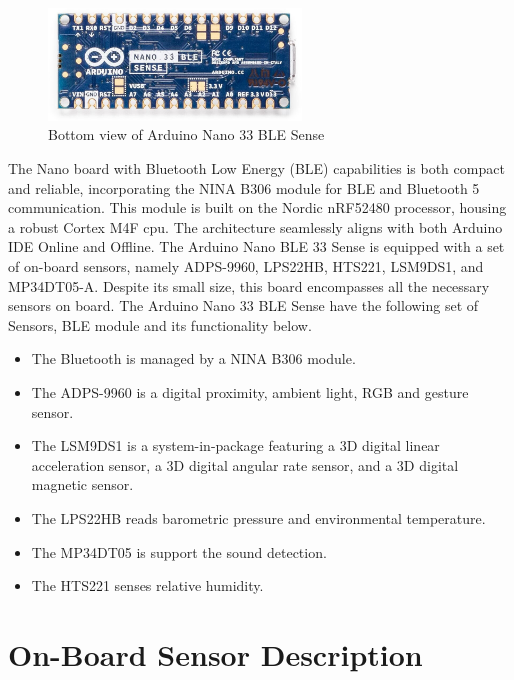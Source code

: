 \begin{figure}[h!]
	\centering
	\includegraphics[width=0.6\textwidth]{Images/hardware/arduino-nano-33-ble-sense_2.jpg}
	\caption{Bottom view of Arduino Nano 33 BLE Sense} \label{fig:Arduino}
\end{figure}


The Nano board with Bluetooth Low Energy (BLE) capabilities is both compact and reliable, incorporating the NINA B306 module for BLE and Bluetooth 5 communication. This module is built on the Nordic nRF52480 processor, housing a robust Cortex M4F \ac{cpu}. The architecture seamlessly aligns with both Arduino IDE Online and Offline. The Arduino Nano BLE 33 Sense is equipped with a set of on-board sensors, namely ADPS-9960, LPS22HB, HTS221, LSM9DS1, and MP34DT05-A. Despite its small size, this board encompasses all the necessary sensors on board.
The Arduino Nano 33 BLE Sense have the following set of Sensors, BLE module and
its functionality below.\cite{Arduino:2023}

\begin{itemize}
	\item The Bluetooth is managed by a NINA B306 module.
	\item The ADPS-9960 is a digital proximity, ambient light, RGB and gesture sensor.
	\item The LSM9DS1 is a system-in-package featuring a 3D digital linear acceleration
	sensor, a 3D digital angular rate sensor, and a 3D digital magnetic sensor.
	\item The LPS22HB reads barometric pressure and environmental temperature.
	\item The MP34DT05 is support the sound detection.
	\item The HTS221 senses relative humidity.
\end{itemize}

\section{On-Board Sensor Description}

